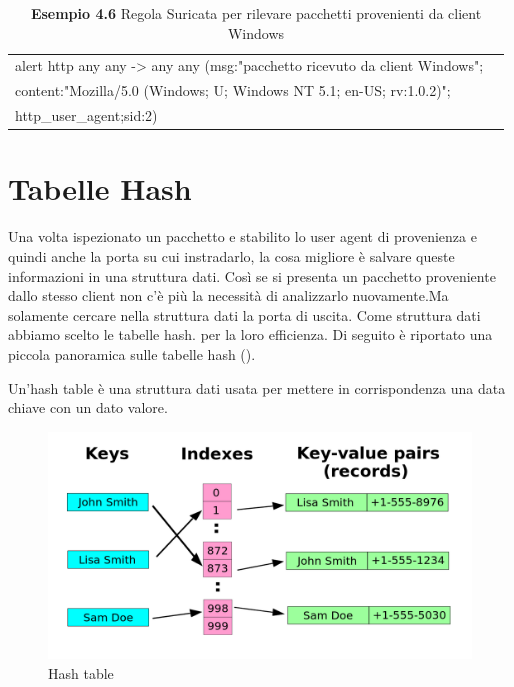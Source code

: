 \documentclass[binding=0.6cm]{sapthesis}
\theoremstyle{definition}
\begin{document}
\begin{table}[H]
    \centering
    
    \caption*{\textbf{Esempio 4.6} Regola Suricata per rilevare pacchetti provenienti da client Windows}
    \begin{tabular}{ |l|c|}
        \hline
        alert http any any -> any any (msg:"pacchetto ricevuto da client Windows"; \\
        content:"Mozilla/5.0 (Windows; U; Windows NT 5.1; en-US; rv:1.0.2)"; \\
        http\_user\_agent;sid:2)\\

        \hline
    \end{tabular}
\end{table}




\section{Tabelle Hash}
\label{chapter:hash table}
Una volta ispezionato un pacchetto e stabilito lo user agent di provenienza e quindi anche la porta
su cui instradarlo, la cosa migliore è salvare queste informazioni in una struttura dati.
Così se si presenta un pacchetto proveniente dallo stesso client non c'è più la necessità di analizzarlo
nuovamente.Ma solamente cercare nella struttura dati la porta di uscita.
Come struttura dati abbiamo scelto le tabelle hash. per la loro efficienza.
Di seguito è riportato una piccola panoramica sulle tabelle hash (\cite{hash table }).

Un'hash table è una struttura dati usata per mettere in corrispondenza una data chiave con un 
dato valore.

\begin{figure}[h]
    \centering
    \includegraphics[scale=0.2]{hash-table.png}
    \caption{Hash table}
    \label{fig:hash-table}
\end{figure}
\end{document}
